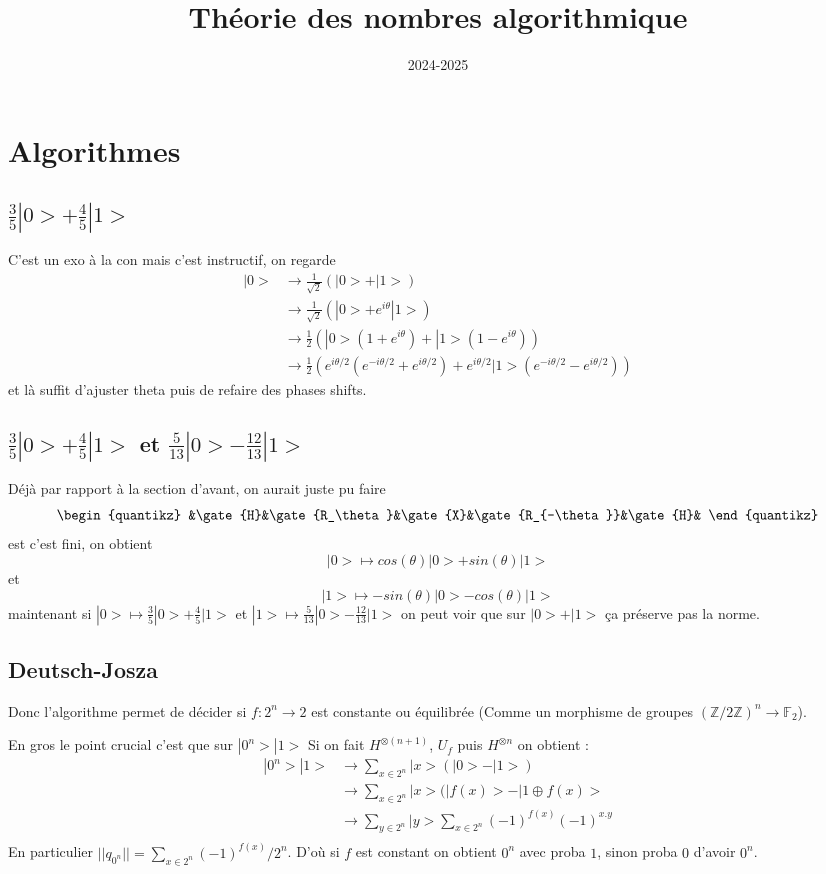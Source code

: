 \documentclass[a4paper,12pt]{book}
\title{Théorie des nombres algorithmique}
\date{2024-2025}
\newcommand{\Z}{\mathbb{Z}}
\newcommand{\F}{\mathbb F}
\theoremstyle{plain}
\theoremstyle{definition}
\theoremstyle{remark}
\begin{document}
\maketitle
\tableofcontents

\chapter{Algorithmes}
\section{$\frac{3}{5}|0>+\frac{4}{5}|1>$}

C'est un exo à la con mais c'est instructif, on regarde
\begin{align*}
    |0>&\to \frac{1}{\sqrt 2}(|0>+|1>)\\
       &\to \frac{1}{\sqrt 2}(|0>+e^{i\theta}|1>)\\
       &\to \frac{1}{2}(|0>(1+e^{i\theta})+|1>(1-e^{i\theta}))\\
       &\to \frac{1}{2}(e^{i\theta /2}(e^{-i\theta /2}+e^{i\theta /2})
       +e^{i\theta /2}|1>(e^{-i\theta /2}-e^{i\theta /2}))
\end{align*}
et là suffit d'ajuster theta puis de refaire des phases shifts.

\section{$\frac{3}{5}|0>+\frac{4}{5}|1>$ et $\frac{5}{13}|0>-\frac{12}{13}|1>$}
Déjà par rapport à la section d'avant, on aurait juste pu faire
\[
\begin{quantikz}
    &\gate{H}&\gate{R_\theta}&\gate{X}&\gate{R_{-\theta}}&\gate{H}&
\end{quantikz}
\]
est c'est fini, on obtient 
\[|0>\mapsto cos(\theta)|0>+sin(\theta)|1>\]
et
\[|1>\mapsto -sin(\theta)|0>-cos(\theta)|1>\]
maintenant si $|0>\mapsto \frac{3}{5}|0>+\frac{4}{5}|1>$
et $|1>\mapsto \frac{5}{13}|0>-\frac{12}{13}|1>$ on peut voir
que sur $|0>+|1>$ ça préserve pas la norme.

\section{Deutsch-Josza}
Donc l'algorithme permet de décider si $f\colon 2^n\to 2$ est constante
ou équilibrée (Comme un morphisme de groupes $(\Z/2\Z)^n\to \F_2$).
\newline

En gros le point crucial c'est que sur $|0^n>|1>$
Si on fait $H^{\otimes (n+1)}$, $U_f$ puis $H^{\otimes n}$ on obtient :
\begin{align*}
    |0^n>|1>&\to \sum_{x\in 2^n}|x>(|0>-|1>)\\
            &\to \sum_{x\in 2^n}|x>(|f(x)>-|1\oplus f(x)>\\
            &\to \sum_{y\in 2^n}|y>\sum_{x\in 2^n}(-1)^{f(x)}(-1)^{x.y}\\
\end{align*}
En particulier $||q_{0^n}||=\sum_{x\in 2^n} (-1)^{f(x)}/2^n$. D'où
si $f$ est constant on obtient $0^n$ avec proba $1$, sinon proba $0$ 
d'avoir $0^n$.
\end{document}
